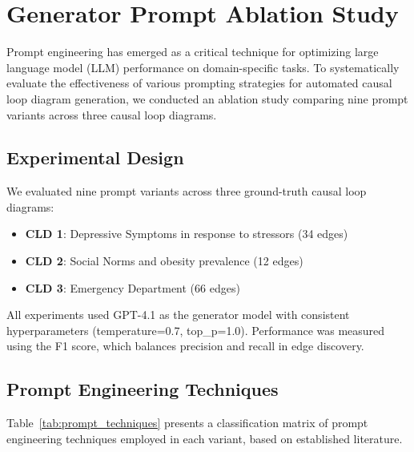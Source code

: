 \chapter{Generator Prompt Ablation Study}
\label{sec:ablation_edge}

Prompt engineering has emerged as a critical technique for optimizing large language model (LLM) performance on domain-specific tasks. To systematically evaluate the effectiveness of various prompting strategies for automated causal loop diagram generation, we conducted an ablation study comparing nine prompt variants across three causal loop diagrams.

\section{Experimental Design}

We evaluated nine prompt variants across three ground-truth causal loop diagrams:
\begin{itemize}[noitemsep]
    \item \textbf{CLD 1}: Depressive Symptoms in response to stressors (34 edges)
    \item \textbf{CLD 2}: Social Norms and obesity prevalence (12 edges)
    \item \textbf{CLD 3}: Emergency Department (66 edges)
\end{itemize}

All experiments used GPT-4.1 as the generator model with consistent hyperparameters (temperature=0.7, top\_p=1.0). Performance was measured using the F1 score, which balances precision and recall in edge discovery.

\section{Prompt Engineering Techniques}

Table~\ref{tab:prompt_techniques} presents a classification matrix of prompt engineering techniques employed in each variant, based on established literature.

